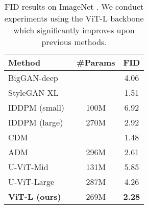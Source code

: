 \begin{table}[t]
\begin{center}
\begin{tabular}{l c c }
\toprule
Method & \#Params & FID \\
\midrule
BigGAN-deep~\cite{brock2018biggan} & {} & 4.06 \\
StyleGAN-XL~\cite{sauer2022styleganxl} & {} & 1.51 \\
\midrule
IDDPM (small)~\cite{nichol2021iddpm} & 100M & 6.92 \\
IDDPM (large)~\cite{nichol2021iddpm} & 270M &  2.92 \\
CDM~\cite{ho2022cdm} & {} &  1.48 \\
ADM~\cite{dhariwal2021adm} & 296M &  2.61 \\
\midrule
U-ViT-Mid~\cite{bao2022uvit} & 131M &   5.85 \\
U-ViT-Large~\cite{bao2022uvit} & 287M &   4.26 \\
\textbf{ViT-L (ours)} & 269M &   \textbf{2.28} \\
\bottomrule
\end{tabular}
\end{center}
\vspace{-5mm}
\caption{
FID results on ImageNet . We conduct experiments using the ViT-L backbone which significantly improves upon previous methods.}
\label{tab:in64}
\end{table}


